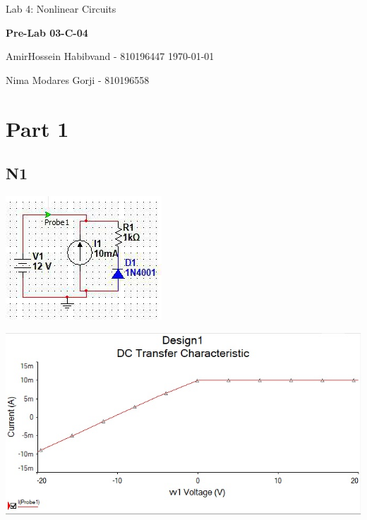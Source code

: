 \documentclass{report}
\newenvironment{Figure}
  {\par\medskip\minipage{\linewidth}}
  {\endminipage\par\medskip}
\begin{document}
    {\large Lab 4: Nonlinear Circuits }
    \hfill
    {\large \textbf{Pre-Lab 03-C-04} \par}
	\vspace{0.1in}
    {\large AmirHossein Habibvand - 810196447}
    \hfill
    \today \par
    {\large Nima Modares Gorji - 810196558 \par}
	\vspace{0.5in}

    \section*{Part 1}
        \begin{multicols}{2}\setlength{\columnseprule}{0pt}
        \centering
            \subsection*{N1}
                \begin{center}
                    \begin{Figure}
                        \includegraphics[width=0.5\linewidth]{net1.jpg}
                    \end{Figure}
                    \begin{Figure}
                        \includegraphics[width=0.5\linewidth]{graph1.jpg}
                    \end{Figure}
                \end{center}
            \vfill\null
            \columnbreak

\end{multicols}
\end{document}

